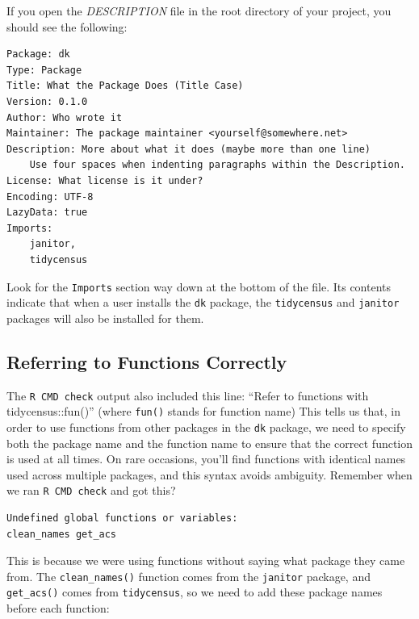 \documentclass[
]{book}
\begin{document}
If you open the \emph{DESCRIPTION} file in the root directory of your project, you should see the following:

\begin{verbatim}
Package: dk
Type: Package
Title: What the Package Does (Title Case)
Version: 0.1.0
Author: Who wrote it
Maintainer: The package maintainer <yourself@somewhere.net>
Description: More about what it does (maybe more than one line)
    Use four spaces when indenting paragraphs within the Description.
License: What license is it under?
Encoding: UTF-8
LazyData: true
Imports: 
    janitor,
    tidycensus
\end{verbatim}

Look for the \texttt{Imports} section way down at the bottom of the file. Its contents indicate that when a user installs the \texttt{dk} package, the \texttt{tidycensus} and \texttt{janitor} packages will also be installed for them.

\hypertarget{referring-to-functions-correctly}{%
\subsection*{Referring to Functions Correctly}\label{referring-to-functions-correctly}}

The \texttt{R\ CMD\ check} output also included this line: ``Refer to functions with tidycensus::fun()'' (where \texttt{fun()} stands for function name) This tells us that, in order to use functions from other packages in the \texttt{dk} package, we need to specify both the package name and the function name to ensure that the correct function is used at all times. On rare occasions, you'll find functions with identical names used across multiple packages, and this syntax avoids ambiguity. Remember when we ran \texttt{R\ CMD\ check} and got this?

\begin{verbatim}
Undefined global functions or variables:
clean_names get_acs
\end{verbatim}

This is because we were using functions without saying what package they came from. The \texttt{clean\_names()} function comes from the \texttt{janitor} package, and \texttt{get\_acs()} comes from \texttt{tidycensus}, so we need to add these package names before each function:
\end{document}
